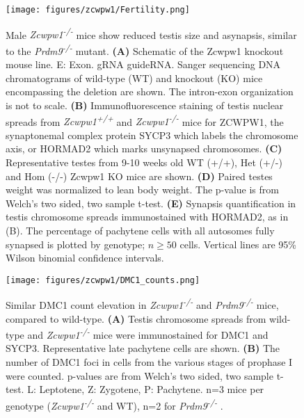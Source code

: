 \begin{figure}[H]
	\centering
	\texttt{[image: figures/zcwpw1/Fertility.png]}
	\caption[Zcwpw1 KO Phenotypes]{
		Male \textit{Zcwpw1\textsuperscript{-/-}} mice show reduced testis size and asynapsis, similar to the \textit{Prdm9\textsuperscript{-/-}} mutant.
		\textbf{(A)} Schematic of the Zcwpw1 knockout mouse line. E: Exon. gRNA guideRNA. Sanger sequencing DNA chromatograms of wild-type (WT) and knockout (KO) mice encompassing the deletion are shown. The intron-exon organization is not to scale.
		\textbf{(B)} Immunofluorescence staining of testis nuclear spreads from \textit{Zcwpw1\textsuperscript{+/+}} and \textit{Zcwpw1\textsuperscript{-/-}} mice for ZCWPW1, the synaptonemal complex protein SYCP3 which labels the chromosome axis, or HORMAD2 which marks unsynapsed chromosomes.
		\textbf{(C)} Representative testes from 9-10 weeks old WT (+/+), Het (+/-) and Hom (-/-) Zcwpw1 KO mice are shown.
		\textbf{(D)} Paired testes weight was normalized to lean body weight. The p-value is from Welch’s two sided, two sample t-test. \iffalse supp table 3 \fi
		\textbf{(E)} Synapsis quantification in testis chromosome spreads immunostained with HORMAD2, as in (B). The percentage of pachytene cells with all autosomes fully synapsed is plotted by genotype; $n\ge50$ cells. Vertical lines are 95\% Wilson binomial confidence intervals. \iffalse raw data table 4 \fi
	}
	\label{fig:Fertility}
\end{figure}

\begin{figure}[H]
	\centering
	\texttt{[image: figures/zcwpw1/DMC1\_counts.png]}
	\caption[DMC1 Counts]{
		Similar DMC1 count elevation in \textit{Zcwpw1\textsuperscript{-/-}} and \textit{Prdm9\textsuperscript{-/-}} mice, compared to wild-type.
		\textbf{(A)} Testis chromosome spreads from wild-type and \textit{Zcwpw1\textsuperscript{-/-}} mice were immunostained for DMC1 and SYCP3. Representative late pachytene cells are shown.
		\textbf{(B)} The number of DMC1 foci in cells from the various stages of prophase I were counted. p-values are from Welch’s two sided, two sample t-test. L: Leptotene, Z: Zygotene, P: Pachytene. n=3 mice per genotype (\textit{Zcwpw1\textsuperscript{-/-}} and WT), n=2 for \textit{Prdm9\textsuperscript{-/-}} \iffalse raw data \fi.
	}
	\label{fig:DMC1_count}
\end{figure}

